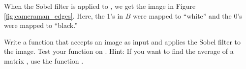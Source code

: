 When the Sobel filter is applied to , we get the image in Figure \ref{fig:cameraman_edges}.
Here, the 1's in $B$ were mapped to ``white'' and the 0's were mapped to ``black.''

\begin{problem}
Write a function that accepts an image as input and applies the Sobel filter to the image.  Test your function on .  Hint: If you want to find the average of a matrix , use the function .
\end{problem}
